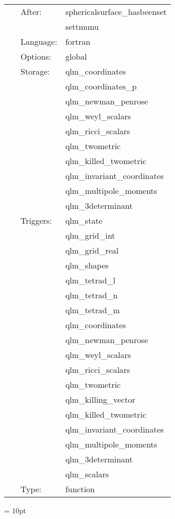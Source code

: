  \begin{tabular*}{160mm}{cll} 
~ & After:  & sphericalsurface\_hasbeenset \\ 
~& ~ &settmunu\\ 
~ & Language:  & fortran \\ 
~ & Options:  & global \\ 
~ & Storage:  & qlm\_coordinates \\ 
~& ~ &qlm\_coordinates\_p\\ 
~& ~ &qlm\_newman\_penrose\\ 
~& ~ &qlm\_weyl\_scalars\\ 
~& ~ &qlm\_ricci\_scalars\\ 
~& ~ &qlm\_twometric\\ 
~& ~ &qlm\_killed\_twometric\\ 
~& ~ &qlm\_invariant\_coordinates\\ 
~& ~ &qlm\_multipole\_moments\\ 
~& ~ &qlm\_3determinant\\ 
~ & Triggers:  & qlm\_state \\ 
~& ~ &qlm\_grid\_int\\ 
~& ~ &qlm\_grid\_real\\ 
~& ~ &qlm\_shapes\\ 
~& ~ &qlm\_tetrad\_l\\ 
~& ~ &qlm\_tetrad\_n\\ 
~& ~ &qlm\_tetrad\_m\\ 
~& ~ &qlm\_coordinates\\ 
~& ~ &qlm\_newman\_penrose\\ 
~& ~ &qlm\_weyl\_scalars\\ 
~& ~ &qlm\_ricci\_scalars\\ 
~& ~ &qlm\_twometric\\ 
~& ~ &qlm\_killing\_vector\\ 
~& ~ &qlm\_killed\_twometric\\ 
~& ~ &qlm\_invariant\_coordinates\\ 
~& ~ &qlm\_multipole\_moments\\ 
~& ~ &qlm\_3determinant\\ 
~& ~ &qlm\_scalars\\ 
~ & Type:  & function \\ 
\end{tabular*} 



\vspace{5mm}\parskip = 10pt 

